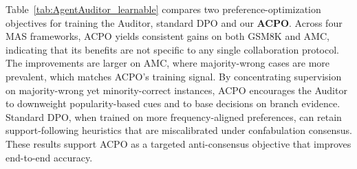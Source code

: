 \documentclass{article}
\theoremstyle{plain}
\theoremstyle{definition}
\theoremstyle{remark}
\begin{document}
Table~\ref{tab:AgentAuditor_learnable} compares two preference-optimization objectives for training the Auditor, standard DPO and our \textbf{ACPO}. Across four MAS frameworks, ACPO yields consistent gains on both GSM8K and AMC, indicating that its benefits are not specific to any single collaboration protocol. The improvements are larger on AMC, where majority-wrong cases are more prevalent, which matches ACPO's training signal. By concentrating supervision on majority-wrong yet minority-correct instances, ACPO encourages the Auditor to downweight popularity-based cues and to base decisions on branch evidence. Standard DPO, when trained on more frequency-aligned preferences, can retain support-following heuristics that are miscalibrated under confabulation consensus. These results support ACPO as a targeted anti-consensus objective that improves end-to-end accuracy.


\end{document}

